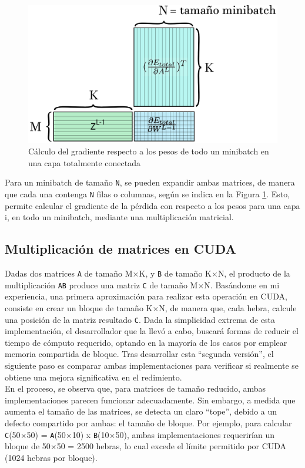 \begin{figure}[H]
	\centering
	\includegraphics[scale=0.25]{imagenes/gemm_fully_back_w_minibatch.jpg}  
	\caption{Cálculo del gradiente respecto a los pesos de todo un minibatch en una capa totalmente conectada}
	\label{fig:gemm_fully_back_w_minibatch}
\end{figure}

Para un minibatch de tamaño \texttt{N}, se pueden expandir ambas matrices, de manera que cada una contenga \texttt{N} filas o columnas, según se indica en la Figura \ref{fig:gemm_fully_back_w_minibatch}. Esto, permite calcular el gradiente de la pérdida con respecto a los pesos para una capa i, en todo un minibatch, mediante una multiplicación matricial.

\subsection{Multiplicación de matrices en CUDA}

Dadas dos matrices \texttt{A} de tamaño M$\times$K, y \texttt{B} de tamaño K$\times$N, el producto de la multiplicación \texttt{AB} produce una matriz \texttt{C} de tamaño M$\times$N. Basándome en mi experiencia, una primera aproximación para realizar esta operación en CUDA, consiste en crear un bloque de tamaño K$\times$N, de manera que, cada hebra, calcule una posición de la matriz resultado \texttt{C}. Dada la simplicidad extrema de esta implementación, el desarrollador que la llevó a cabo, buscará formas de reducir el tiempo de cómputo requerido, optando en la mayoría de los casos por emplear memoria compartida de bloque. Tras desarrollar esta ``segunda versión'', el siguiente paso es comparar ambas implementaciones para verificar si realmente se obtiene una mejora significativa en el redimiento. \\
En el proceso, se observa que, para matrices de tamaño reducido, ambas implementaciones parecen funcionar adecuadamente. Sin embargo, a medida que aumenta el tamaño de las matrices, se detecta un claro ``tope'', debido a un defecto compartido por ambas: el tamaño de bloque. Por ejemplo, para calcular \texttt{C}(50$\times$50) = \texttt{A}(50$\times$10) x \texttt{B}(10$\times$50), ambas implementaciones requerirían un bloque de 50$\times$50 = 2500 hebras, lo cual excede el límite permitido por CUDA (1024 hebras por bloque). \\

